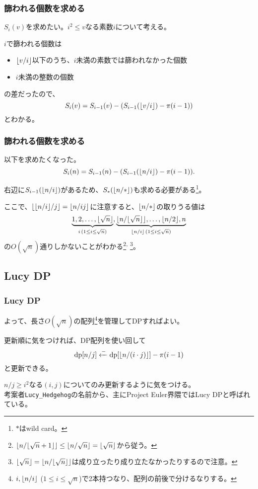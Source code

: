 \documentclass[
  lualatex,
  ja=standard,
  compress,
  hyperref={colorlinks, urlcolor=magenta, linkcolor=blue!55!black},
  dvipsnames,
  svgnames,
]{beamer}
\newcommand{\xgets}[1]{\xleftarrow{#1}}
\newcommand{\wildcard}{*}
\newcommand{\DP}{\mathrm{dp}}
\begin{document}
\begin{frame}
  \frametitle{篩われる個数を求める \theslidetopic}

  $S_i(v)$を求めたい。$i^2\le v$なる素数$i$について考える。

  $i$で篩われる個数は
  \begin{itemize}
  \item $\lfloor v/i\rfloor$以下のうち、$i$未満の素数では篩われなかった個数
  \item $i$未満の整数の個数
  \end{itemize}
  の差だったので、
  $$
  S_i(v) = S_{i-1}(v) - (S_{i-1}(\lfloor v/i\rfloor) - \pi(i-1))
  $$
  とわかる。
\end{frame}

\begin{frame}
  \frametitle{篩われる個数を求める \theslidetopic}

  以下を求めたくなった。
  $$ S_i(n) = S_{i-1}(n) - (S_{i-1}(\lfloor n/i\rfloor) - \pi(i-1)). $$

  右辺に$S_{i-1}(\lfloor n/i\rfloor)$があるため、$S_{\wildcard}(\floor{n/\wildcard})$も求める必要がある\footnote{$\wildcard$はwild card。}。

  ここで、$\lfloor\lfloor n/i\rfloor/j\rfloor = \lfloor n/ij\rfloor$に注意すると、$\floor{n/\wildcard}$の取りうる値は
  $$
  \underbrace{1, 2, \dots, \lfloor\sqrt{n}\rfloor}_{i\,(1\le i\le\sqrt{n})},
  \underbrace{\lfloor n/\lfloor\sqrt{n}\rfloor\rfloor, \dots, \lfloor n/2\rfloor, n}_{\lfloor n/i\rfloor\,(1\le i\le\sqrt{n})}
  $$
  の$O(\sqrt{n})$通りしかないことがわかる\footnote{$\lfloor n/\lfloor\sqrt{n}+1\rfloor\rfloor\le\lfloor n/\sqrt{n}\rfloor=\lfloor\sqrt{n}\rfloor$から従う。}\textsuperscript{, }\footnote{$\lfloor\sqrt{n}\rfloor = \lfloor n/\lfloor\sqrt{n}\rfloor\rfloor$は成り立ったり成り立たなかったりするので注意。}。
\end{frame}

\setcounter{slidetopic}{0}
\subsection{Lucy DP}
\begin{frame}
  \frametitle{Lucy DP \theslidetopic}

  よって、長さ$O(\sqrt{n})$の配列\footnote{$i, \lfloor n/i\rfloor$ ($1\le i\le\sqrt{n}$)で2本持つなり、配列の前後で分けるなりする。}を管理してDPすればよい。

  更新順に気をつければ、DP配列を使い回して
  $$
  \DP[n/j] \xgets{-} \DP[\floor{n/(i\cdot j)}] - \pi(i-1)
  $$
  と更新できる。

  $n/j\ge i^2$なる$(i, j)$についてのみ更新するように気をつける。\\

  考案者\texttt{\small Lucy\_Hedgehog}の名前から、主にProject Euler界隈ではLucy DPと呼ばれている。
\end{frame}
\end{document}
